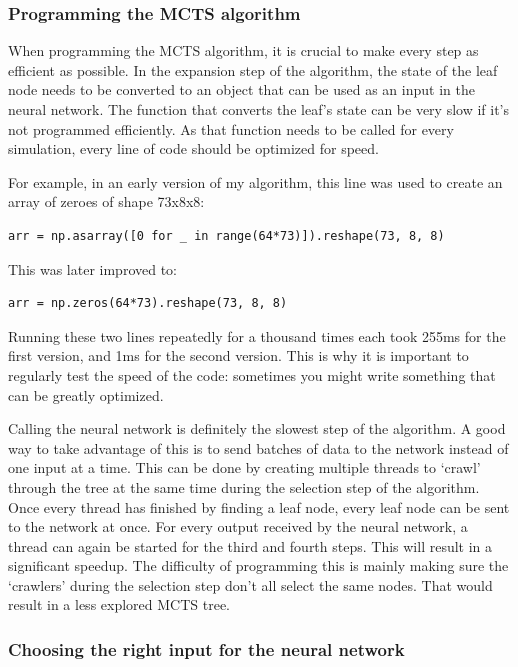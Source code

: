 \documentclass{article}
\begin{document}
\subsubsection{Programming the MCTS algorithm}

When programming the MCTS algorithm, it is crucial to make every step as efficient as possible.
In the expansion step of the algorithm, the state of the leaf node needs to be converted to an object
that can be used as an input in the neural network. The function that converts the leaf's state 
can be very slow if it's not programmed efficiently. As that function needs to be called for every
simulation, every line of code should be optimized for speed.

For example, in an early version of my algorithm, this line was used to create an array of zeroes of 
shape 73x8x8:

\begin{verbatim}
arr = np.asarray([0 for _ in range(64*73)]).reshape(73, 8, 8)
\end{verbatim}

This was later improved to:

\begin{verbatim}
arr = np.zeros(64*73).reshape(73, 8, 8)
\end{verbatim}

Running these two lines repeatedly for a thousand times each took 255ms for the first version, and 1ms for the second version.
This is why it is important to regularly test the speed of the code: sometimes you might write something
that can be greatly optimized. 


Calling the neural network is definitely the slowest step of the algorithm. A good way to take 
advantage of this is to send batches of data to the network instead of one input at a time. 
This can be done by creating multiple threads to `crawl' through the tree at the same time 
during the selection step of the algorithm. 
Once every thread has finished by finding a leaf node, every leaf node can be sent to the network at once. 
For every output received by the neural network, a thread can again be started for the third and fourth steps. 
This will result in a significant speedup. 
The difficulty of programming this is mainly making sure the `crawlers' during the selection step
don't all select the same nodes. That would result in a less explored MCTS tree.

\subsubsection{Choosing the right input for the neural network}
\end{document}
